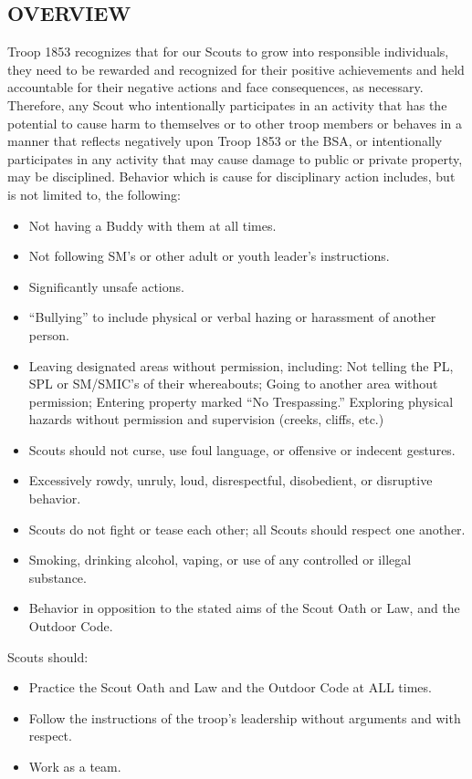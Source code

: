 \documentclass{ltxguide}
\begin{document}
\subsection{OVERVIEW}
Troop 1853 recognizes that for our Scouts to grow into responsible individuals, they need to be rewarded and recognized for their positive achievements and held accountable for their negative actions and face consequences, as necessary. Therefore, any Scout who intentionally participates in an activity that has the potential to cause harm to themselves or to other troop members or behaves in a manner that    reflects negatively upon Troop 1853 or the \ac{BSA}, or intentionally participates in any activity that may cause damage to public or private property, may be disciplined. Behavior which is cause for disciplinary action includes, but is not limited to, the following:
\begin{itemize}
	\item Not having a Buddy with them at all times.
	\item Not following \ac{SM}'s or other adult or youth leader's instructions.
	\item Significantly unsafe actions.
	\item “Bullying” to include physical or verbal hazing or harassment of another person.
	\item Leaving designated areas without permission, including:
		\subitem Not telling the PL, SPL or SM/SMIC's of their whereabouts;
		\subitem Going to another area without permission;
		\subitem Entering property marked “No Trespassing.”
		\subitem Exploring physical hazards without permission and supervision (creeks, cliffs, etc.)
	\item Scouts should not curse, use foul language, or offensive or indecent gestures.
	\item Excessively rowdy, unruly, loud, disrespectful, disobedient, or disruptive behavior.
	\item Scouts do not fight or tease each other; all Scouts should respect one another.
	\item Smoking, drinking alcohol, vaping, or use of any controlled or illegal substance.
	\item Behavior in opposition to the stated aims of the Scout Oath or Law, and the Outdoor Code.
\end{itemize}

Scouts should:
\begin{itemize}
	\item Practice the Scout Oath and Law and the Outdoor Code at ALL times.
	\item Follow the instructions of the troop's leadership without arguments and with respect.
	\item Work as a team.
\end{itemize}
\end{document}
